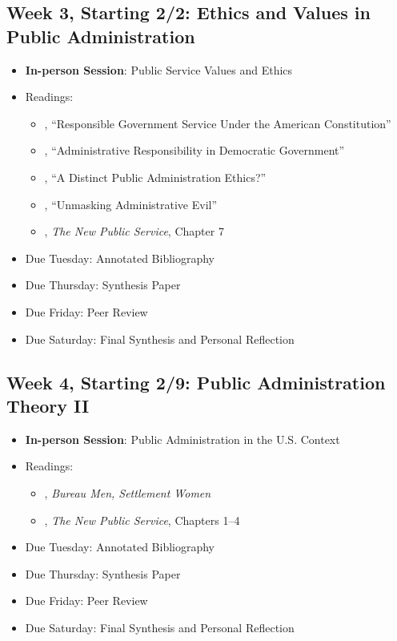 \documentclass[12pt, letterpaper]{article}
\begin{document}
\subsection*{Week 3, Starting 2/2: Ethics and Values in Public Administration}
\begin{itemize}
    \item \textbf{In-person Session}: Public Service Values and Ethics
    \item Readings:
        \begin{itemize}
            \item \citet{friedrich1935}, ``Responsible Government Service Under the American Constitution'' 
            \item \citet{FINER1941}, ``Administrative Responsibility in Democratic Government'' 
            \item \citet{goss1996}, ``A Distinct Public Administration Ethics?'' 
            \item \citet{Adams2009}, ``Unmasking Administrative Evil'' 
            \item \citet{Denhardt2015}, \emph{The New Public Service}, Chapter 7 
        \end{itemize}
    \item Due Tuesday: Annotated Bibliography
    \item Due Thursday: Synthesis Paper
    \item Due Friday: Peer Review
    \item Due Saturday: Final Synthesis and Personal Reflection
\end{itemize}

\subsection*{Week 4, Starting 2/9: Public Administration Theory II}
\begin{itemize}
    \item \textbf{In-person Session}: Public Administration in the U.S. Context
    \item Readings:
        \begin{itemize}
            \item \citet{Stivers2000}, \emph{Bureau Men, Settlement Women} 
            \item \citet{Denhardt2015}, \emph{The New Public Service}, Chapters 1--4 
        \end{itemize}
    \item Due Tuesday: Annotated Bibliography
    \item Due Thursday: Synthesis Paper
    \item Due Friday: Peer Review
    \item Due Saturday: Final Synthesis and Personal Reflection
\end{itemize}
\end{document}
